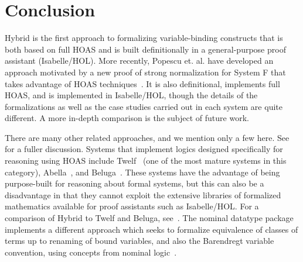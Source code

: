 \documentclass[copyright,creativecommons]{eptcs}
\begin{document}
\begin{Lem}
\label{lem:hybrid-expand-abstr} \formal
\par\nopagebreak
\par\nopagebreak[3]
\par\nopagebreak[3]
\par\nopagebreak

\end{Lem}

\section{Conclusion}
\label{sec:conclude}

Hybrid is the first approach to formalizing variable-binding
constructs that is both based on full HOAS and is built definitionally
in a general-purpose proof assistant (Isabelle\slash HOL).  More
recently, Popescu et. al. have developed an approach motivated by a
new proof of strong normalization for System F that takes advantage of
HOAS techniques~\cite{popescu/gunter/osborn:2010}.  It is also
definitional, implements full HOAS, and is implemented in Isabelle/HOL,
though the details of the formalizations as well as the case studies
carried out in each system are quite different.  A more
in-depth comparison is the subject of future work.

There are many other related approaches, and we mention only a few
here. See~\cite{felty/momigliano:2008, martin:2010a} for a fuller
discussion.  Systems that implement logics designed specifically for
reasoning using HOAS include Twelf~\cite{pfenning/schurmann:1999} (one
of the most mature systems in this category),
Abella~\cite{gacek:2008}, and Beluga~\cite{pientka/dunfield:2010}.
These systems have the advantage of being purpose-built for reasoning
about formal systems, but this can also be a disadvantage in that they
cannot exploit the extensive libraries of formalized mathematics
available for proof assistants such as Isabelle\slash HOL.
For a comparison of Hybrid to Twelf and Beluga,
see~\cite{felty/pientka:ITP2011}.
The nominal datatype package~\cite{Urban:JAR2008} implements a
different approach which seeks to formalize equivalence of classes of
terms up to renaming of bound variables, and also the Barendregt
variable convention, using concepts from nominal
logic~\cite{GabbayPitts:FAC2002,Pitts:IandC2003}.
\end{document}
